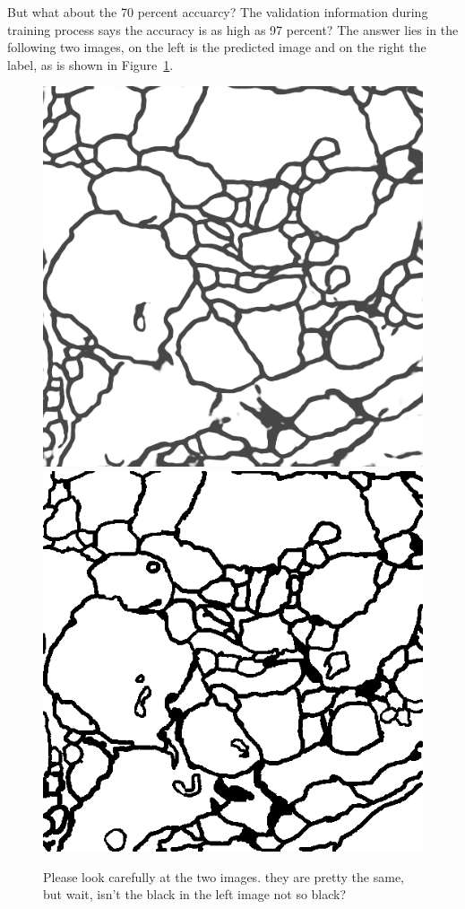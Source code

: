 But what about the 70 percent accuarcy? The validation information during training process says the accuracy is as high as 97 percent? The answer lies in the following two images, on the left is the predicted image and on the right the label, as is shown in Figure~\ref{fig:unetcomp}.
\begin{figure}[htpb]
    \centering
    \includegraphics[scale=0.2]{figuras/2_predict.png}
    \includegraphics[scale=0.2]{figuras/2.png}
    \caption{Please look carefully at the two images. they are pretty the same, but wait, isn't the black in the left image not so black?}\label{fig:unetcomp}
\end{figure}

